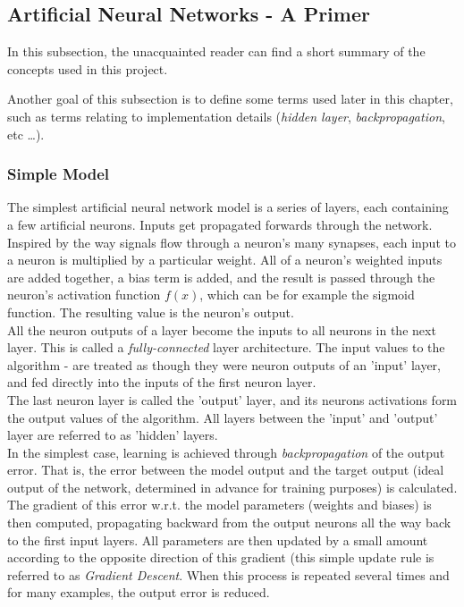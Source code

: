 \subsection{Artificial Neural Networks - A Primer}
\label{subsec:primer}

In this subsection, the unacquainted reader can find a short summary of the concepts used in this project.

Another goal of this subsection is to define some terms used later in this chapter, such as terms relating to implementation details (\textit{hidden layer}, \textit{backpropagation}, etc \ldots).

\subsubsection{Simple Model}
\label{subsubsec:simple-model}

The simplest artificial neural network model is a series of layers, each containing a few artificial neurons. Inputs get propagated forwards through the network. Inspired by the way signals flow through a neuron's many synapses, each input to a neuron is multiplied by a particular weight. All of a neuron's weighted inputs are added together, a bias term is added, and the result is passed through the neuron's activation function $f(x)$, which can be for example the sigmoid function. The resulting value is the neuron's output.\\

All the neuron outputs of a layer become the inputs to all neurons in the next layer. This is called a \textit{fully-connected} layer architecture. The input values to the algorithm - are treated as though they were neuron outputs of an 'input' layer, and fed directly into the inputs of the first neuron layer.\\

The last neuron layer is called the 'output' layer, and its neurons activations form the output values of the algorithm. All layers between the 'input' and 'output' layer are referred to as 'hidden' layers.\\

In the simplest case, learning is achieved through \textit{backpropagation} of the output error. That is, the error between the model output and the target output (ideal output of the network, determined in advance for training purposes) is calculated. The gradient of this error w.r.t. the model parameters (weights and biases) is then computed, propagating backward from the output neurons all the way back to the first input layers. All parameters are then updated by a small amount according to the opposite direction of this gradient (this simple update rule is referred to as \textit{Gradient Descent}. When this process is repeated several times and for many examples, the output error is reduced.\\

